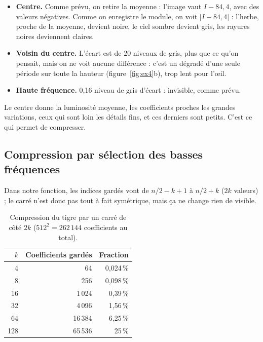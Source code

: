 \documentclass[11pt,a4paper]{article}
\begin{document}
\begin{itemize}
  \item \textbf{Centre.} Comme prévu, on retire la moyenne : l'image vaut
        $I - 84{,}4$, avec des valeurs négatives. Comme on enregistre le module, on
        voit $|I - 84{,}4|$ : l'herbe, proche de la moyenne, devient noire, le ciel
        sombre devient gris, les rayures noires deviennent claires.
  \item \textbf{Voisin du centre.} L'écart est de 20 niveaux de gris, plus que ce
        qu'on pensait, mais on ne voit aucune différence : c'est un dégradé d'une seule
        période sur toute la hauteur (figure~\ref{fig:ex4}b), trop lent pour l'\oe il.
  \item \textbf{Haute fréquence.} 0,16 niveau de gris d'écart : invisible, comme
        prévu.
\end{itemize}
Le centre donne la luminosité moyenne, les coefficients proches les grandes
variations, ceux qui sont loin les détails fins, et ces derniers sont petits. C'est
ce qui permet de compresser.

\subsection{Compression par sélection des basses fréquences}

Dans notre fonction, les indices gardés vont de $n/2-k+1$ à $n/2+k$ ($2k$ valeurs) ;
le carré n'est donc pas tout à fait symétrique, mais ça ne change rien de visible.

\begin{table}[H]
\centering
\caption{Compression du tigre par un carré de côté $2k$ ($512^2 = 262\,144$
coefficients au total).}
\label{tab:ex5}
\begin{tabular}{|r|r|r|}
\hline
$k$ & \textbf{Coefficients gardés} & \textbf{Fraction} \\
\hline
4   & 64      & 0,024\,\% \\
\hline
8   & 256     & 0,098\,\% \\
\hline
16  & 1\,024  & 0,39\,\%  \\
\hline
32  & 4\,096  & 1,56\,\%  \\
\hline
64  & 16\,384 & 6,25\,\%  \\
\hline
128 & 65\,536 & 25\,\%    \\
\hline
\end{tabular}
\end{table}
\end{document}
